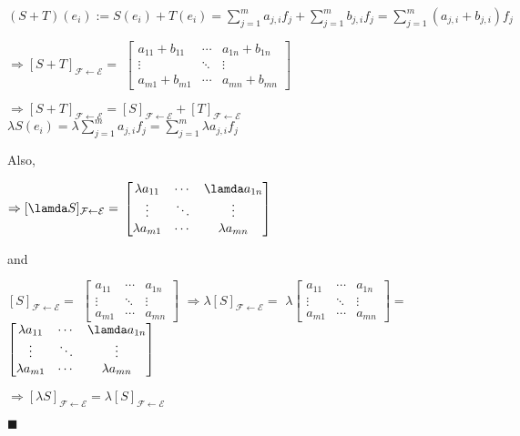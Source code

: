 \documentclass{article}
\begin{document}
$(S+T)(e_i) := S(e_i) + T(e_i) = \sum_{j=1}^ma_{j,i}f_j +
\sum_{j=1}^mb_{j,i}f_j = \sum_{j=1}^m(a_{j,i} + b_{j,i})f_j$


$\Rightarrow [S+T]_{\mathcal{F} \leftarrow \mathcal{E}} =$
$\begin{bmatrix}
a_{11} + b_{11} &\cdots & a_{1n} + b_{1n}\\
\vdots&\ddots&\vdots\\
a_{m1} + b_{m1}&\cdots& a_{mn} + b_{mn}
\end{bmatrix}
$

$\Rightarrow [S + T ]_{\mathcal{F} \leftarrow \mathcal{E}} = [S]_{\mathcal{F}
    \leftarrow \mathcal{E}} + [T ]_{\mathcal{F} \leftarrow
    \mathcal{E}}$\\

$\lambda S(e_i) = \lambda \sum_{j=1}^ma_{j,i}f_j = \sum_{j=1}^m
\lambda a_{j,i}f_j$

Also,

$\Rightarrow [\lamda S]_{\mathcal{F} \leftarrow \mathcal{E}} =$
$\begin{bmatrix}
\lambda a_{11}&\cdots & \lamda a_{1n}\\
\vdots&\ddots&\vdots\\
\lambda a_{m1}&\cdots& \lambda a_{mn}
\end{bmatrix}
$

and

$[S]_{\mathcal{F} \leftarrow \mathcal{E}} =$
$\begin{bmatrix}
a_{11}&\cdots & a_{1n}\\
\vdots&\ddots&\vdots\\
a_{m1}&\cdots& a_{mn}
\end{bmatrix}
$
$\Rightarrow \lambda [S]_{\mathcal{F} \leftarrow \mathcal{E}} =$
$\lambda
\begin{bmatrix}
a_{11}&\cdots & a_{1n}\\
\vdots&\ddots&\vdots\\
a_{m1}&\cdots& a_{mn}
\end{bmatrix}
$$ = $
$\begin{bmatrix}
\lambda a_{11}&\cdots & \lamda a_{1n}\\
\vdots&\ddots&\vdots\\
\lambda a_{m1}&\cdots& \lambda a_{mn}
\end{bmatrix}
$

$\Rightarrow [λS]_{\mathcal{F} \leftarrow \mathcal{E}} = λ[S]_{\mathcal{F}
    \leftarrow \mathcal{E}}$


\vspace{0.618 em}
$\blacksquare$
\end{document}
